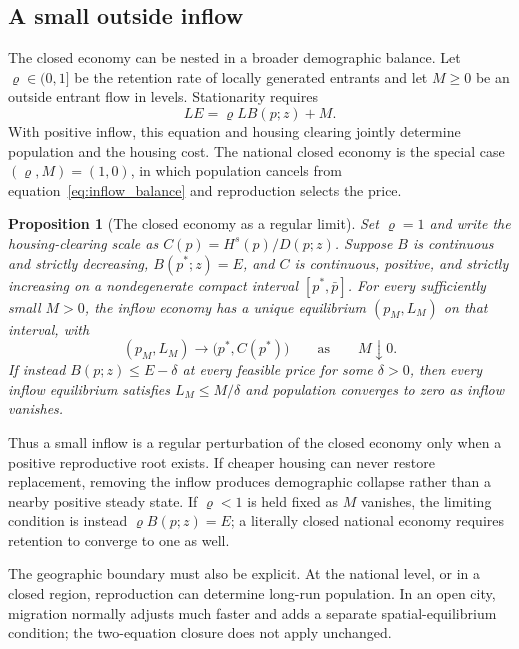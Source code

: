 \documentclass[11pt]{article}
\newtheorem{proposition}{Proposition}
\theoremstyle{definition}
\begin{document}
\subsection*{A small outside inflow}

The closed economy can be nested in a broader demographic balance. Let
$\varrho\in(0,1]$ be the retention rate of locally generated entrants and let
$M\geq0$ be an outside entrant flow in levels. Stationarity requires
\begin{equation}
 L E=\varrho L B(p;z)+M.
 \label{eq:inflow_balance}
\end{equation}
With positive inflow, this equation and housing clearing jointly determine
population and the housing cost. The national closed economy is the special
case $(\varrho,M)=(1,0)$, in which population cancels from
equation~\eqref{eq:inflow_balance} and reproduction selects the price.

\begin{proposition}[The closed economy as a regular limit]
\label{prop:inflow_limit}
Set $\varrho=1$ and write the housing-clearing scale as
$C(p)=H^s(p)/D(p;z)$. Suppose $B$ is continuous and strictly decreasing,
$B(p^*;z)=E$, and $C$ is continuous, positive, and strictly increasing on a
nondegenerate compact interval $[p^*,\bar p]$. For every sufficiently small
$M>0$, the inflow economy has a unique equilibrium $(p_M,L_M)$ on that interval,
with
\begin{equation}
 (p_M,L_M)\longrightarrow\bigl(p^*,C(p^*)\bigr)
 \qquad\text{as}\qquad M\downarrow0.
 \label{eq:inflow_limit}
\end{equation}
If instead $B(p;z)\leq E-\delta$ at every feasible price for some $\delta>0$,
then every inflow equilibrium satisfies $L_M\leq M/\delta$ and population
converges to zero as inflow vanishes.
\end{proposition}

Thus a small inflow is a regular perturbation of the closed economy only when
a positive reproductive root exists. If cheaper housing can never restore
replacement, removing the inflow produces demographic collapse rather than a
nearby positive steady state. If $\varrho<1$ is held fixed as $M$ vanishes, the
limiting condition is instead $\varrho B(p;z)=E$; a literally closed national
economy requires retention to converge to one as well.

The geographic boundary must also be explicit. At the national level, or in a
closed region, reproduction can determine long-run population. In an open city,
migration normally adjusts much faster and adds a separate spatial-equilibrium
condition; the two-equation closure does not apply unchanged.
\end{document}
